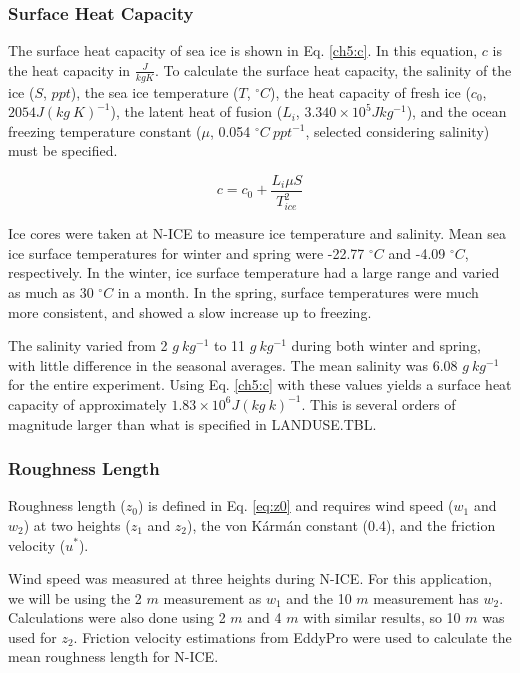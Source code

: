 \subsubsection{Surface Heat Capacity}
The surface heat capacity of sea ice is shown in Eq. \ref{ch5:c}. In this equation, $c$ is the heat capacity in $\frac{J}{kg K}$. To calculate the surface heat capacity, the salinity of the ice ($S$, $ppt$), the sea ice temperature ($T$, $^{\circ} C$), the heat capacity of fresh ice ($c_{0}$, $2054 J(kg~K)^{-1}$), the latent heat of fusion ($L_{i}$, $3.340 \times 10^{5} Jkg^{-1}$), and the ocean freezing temperature constant ($\mu$, 0.054 $^{\circ}C~ppt^{-1}$, selected considering salinity) must be specified. 

\begin{equation}\label{ch5:c}
c = c_{0} + \frac{L_{i}\mu S}{T_{ice}^{2}}
\end{equation}

Ice cores were taken at N-ICE to measure ice temperature and salinity. Mean sea ice surface temperatures for winter and spring were -22.77 $^{\circ}C$ and -4.09 $^{\circ}C$, respectively. In the winter, ice surface temperature had a large range and varied as much as 30 $^{\circ}C$ in a month. In the spring, surface temperatures were much more consistent, and showed a slow increase up to freezing.

The salinity varied from 2 $g~kg^{-1}$ to 11 $g~kg^{-1}$ during both winter and spring, with little difference in the seasonal averages. The mean salinity was 6.08 $g~kg^{-1}$ for the entire experiment. Using Eq. \ref{ch5:c} with these values yields a surface heat capacity of approximately $1.83 \times 10^{6} J(kg~k)^{-1}$. This is several orders of magnitude larger than what is specified in LANDUSE.TBL.

\subsubsection{Roughness Length}
Roughness length ($z_{0}$) is defined in Eq. \ref{eq:z0} and requires wind speed ($w_{1}$ and $w_{2}$) at two heights ($z_{1}$ and $z_{2}$), the von K\'{a}rm\'{a}n constant (0.4), and the friction velocity ($u^{*}$). 

Wind speed was measured at three heights during N-ICE. For this application, we will be using the 2 $m$ measurement as $w_{1}$ and the 10 $m$ measurement has $w_{2}$. Calculations were also done using 2 $m$ and 4 $m$ with similar results, so 10 $m$ was used for $z_{2}$. Friction velocity estimations from EddyPro were used to calculate the mean roughness length for N-ICE.

